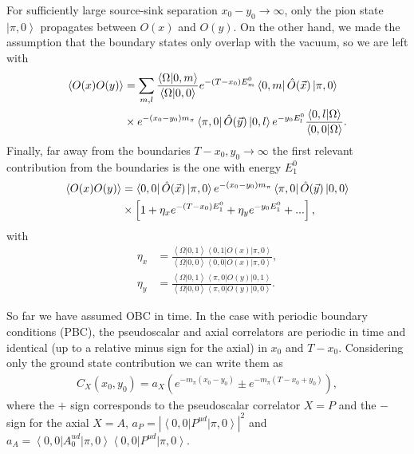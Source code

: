 For sufficiently large source-sink separation $x_0-y_0\rightarrow\infty$, only the pion state $\left|\pi,0\right>$ propagates between $O(x)$ and $O(y)$. On the other hand, we made the assumption that the boundary states only overlap with the vacuum, so we are left with
\begin{align}
\left<O(x)O(y)\right>&=\sum_{m,l}\frac{\left<\Omega|0,m\right>}{\left<\Omega|0,0\right>}e^{-(T-x_0)E_m^{0}}\left<0,m\right|\hat{O}(\vec{x})\left|\pi,0\right> \notag \\
&\times e^{-(x_0-y_0)m_{\pi}}\left<\pi,0\right|\hat{O}(\vec{y})\left|0,l\right>e^{-y_0E_l^{0}}\frac{\left<0,l|\Omega\right>}{\left<0,0|\Omega\right>}.
\end{align}
Finally, far away from the boundaries $T-x_0,y_0\rightarrow\infty$ the first relevant contribution from the boundaries is the one with energy $E_1^0$
\begin{align}
\label{ch_foundation:eq:2pt_spec}
\left<O(x)O(y)\right>&=\left<0,0\right|\hat{O}(\vec{x})\left|\pi,0\right>e^{-(x_0-y_0)m_{\pi}}\left<\pi,0\right|\hat{O}(\vec{y})\left|0,0\right> \notag \\
&\times\left[1+\eta_xe^{-(T-x_0)E_1^0}+\eta_ye^{-y_0E_1^0}+...\right],
\end{align}
with 
\begin{align}
\eta_x&=\frac{\left<\Omega|0,1\right>\left<0,1\right|O(x)\left|\pi,0\right>}{\left<\Omega|0,0\right>\left<0,0\right|O(x)\left|\pi,0\right>}, \\
\eta_y&=\frac{\left<\Omega|0,1\right>\left<\pi,0\right|O(y)\left|0,1\right>}{\left<\Omega|0,0\right>\left<\pi,0\right|O(y)\left|0,0\right>}.
\end{align}

So far we have assumed OBC in time. In the case with periodic boundary conditions (PBC), the pseudoscalar and axial correlators are periodic in time and identical (up to a relative minus sign for the axial) in $x_0$ and $T-x_0$. Considering only the ground state contribution we can write them as
\begin{align}
\label{ch_observables:eq:corrs_PBC}
C_X(x_0,y_0)=a_X\left(e^{-m_{\pi}(x_0-y_0)}\pm e^{-m_{\pi}(T-x_0+y_0)}\right),
\end{align}
where the $+$ sign corresponds to the pseudoscalar correlator $X=P$ and the $-$ sign for the axial $X=A$,  $a_P=|\left<0,0\right|P^{ud}\left|\pi,0\right>|^2$ and $a_A=\left<0,0\right|A_0^{ud}\left|\pi,0\right>\left<0,0\right|P^{ud}\left|\pi,0\right>$. 


